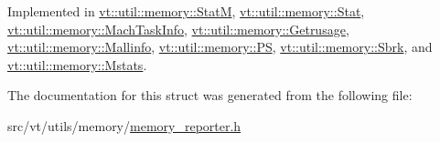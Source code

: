 Implemented in \hyperlink{structvt_1_1util_1_1memory_1_1_stat_m_a066c740a52e05e7184dfff530ed07173}{vt\+::util\+::memory\+::\+StatM}, \hyperlink{structvt_1_1util_1_1memory_1_1_stat_aa14297e6605a523e4164597d45fba06f}{vt\+::util\+::memory\+::\+Stat}, \hyperlink{structvt_1_1util_1_1memory_1_1_mach_task_info_a8d610d4ca50ad62ef2dc623713a67b7d}{vt\+::util\+::memory\+::\+Mach\+Task\+Info}, \hyperlink{structvt_1_1util_1_1memory_1_1_getrusage_a976a842feb631dfb19c2f4ecda2398ab}{vt\+::util\+::memory\+::\+Getrusage}, \hyperlink{structvt_1_1util_1_1memory_1_1_mallinfo_a872e568b6266e301844dbc252886794f}{vt\+::util\+::memory\+::\+Mallinfo}, \hyperlink{structvt_1_1util_1_1memory_1_1_p_s_a8637d08841cd23f361e83be9cc15e2b4}{vt\+::util\+::memory\+::\+PS}, \hyperlink{structvt_1_1util_1_1memory_1_1_sbrk_af4df47e41f60e7f2da7a6b47c8b4a046}{vt\+::util\+::memory\+::\+Sbrk}, and \hyperlink{structvt_1_1util_1_1memory_1_1_mstats_aa3ba12317492d6f3c95f6b2bbb20f831}{vt\+::util\+::memory\+::\+Mstats}.



The documentation for this struct was generated from the following file\+:\begin{DoxyCompactItemize}
\item 
src/vt/utils/memory/\hyperlink{memory__reporter_8h}{memory\+\_\+reporter.\+h}\end{DoxyCompactItemize}
